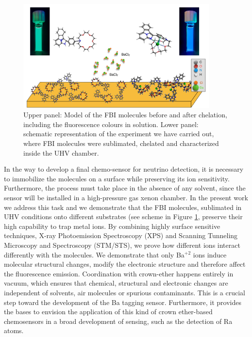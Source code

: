 \documentclass[aps,prl,reprint,longbibliography,superscriptaddress]{revtex4-1}
\def\Ba{Ba$^{+2}$ }
\begin{document}
 \begin{figure}[ht!]
	\includegraphics[width=0.9\textwidth]{figures/fig1_fbi_model.pdf}
	\caption{\label{ModeloFBI} 
    Upper panel: Model of the FBI molecules before and after chelation, including the fluorescence colours in solution. Lower panel: schematic representation of the experiment we have carried out, where FBI molecules were sublimated, chelated and characterized inside the UHV chamber.}
\end{figure}  

 In the way to develop a final chemo-sensor for neutrino detection, it is necessary to immobilize the molecules on a surface while preserving its ion sensitivity. Furthermore, the process must take place in the absence of any solvent, since the sensor will be installed in a high-pressure gas xenon chamber. In the present work we address this task and we demonstrate that the FBI molecules, sublimated in UHV conditions onto different substrates (see scheme in Figure \ref{ModeloFBI}, preserve their high capability to trap metal ions. By combining highly surface sensitive techniques, X-ray Photoemission Spectroscopy (XPS) and Scanning Tunneling Microscopy and Spectroscopy (STM/STS), we prove how different ions interact differently with the molecules. We demonstrate that only \Ba ions induce molecular structural changes, modify the electronic structure and therefore affect the fluorescence emission. Coordination with crown-ether happens entirely in vacuum, which ensures that chemical, structural and electronic changes are independent of solvents, air molecules or spurious contaminants. This is a crucial step toward the development of the Ba tagging sensor. Furthermore, it provides the bases to envision the application of this kind of crown ether-based chemosensors in a broad development of sensing, such as the detection of Ra atoms.
\end{document}
